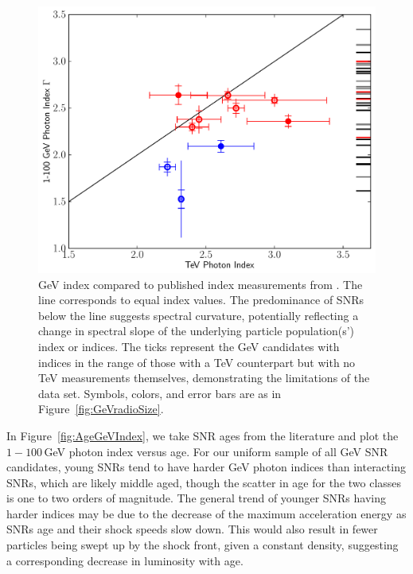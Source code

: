 \begin{figure}[h]
	\centering
	\includegraphics[width=1.0\columnwidth]{figures/gev_vs_tev_index.pdf}
	\caption[GeV index compared to published index measurements from \iacts{}.]{GeV index compared to published index measurements from \iacts{}. The line corresponds to equal index values. The predominance of SNRs below the line suggests spectral curvature, potentially reflecting a change in spectral slope of the underlying particle population(s') index or indices. The ticks represent the GeV candidates with indices in the range of those with a TeV counterpart but with no TeV measurements themselves, demonstrating the limitations of the data set. Symbols, colors, and error bars are as in Figure~\ref{fig:GeVradioSize}. 
	}
	\label{fig:GeVTeVIndex}
\end{figure}

In Figure~\ref{fig:AgeGeVIndex}, we take SNR ages from the literature and plot the $1-100$\,GeV photon index versus age. For our uniform sample of all GeV SNR candidates, young SNRs tend to have harder GeV photon indices than interacting SNRs, which are likely middle aged, though the scatter in age for the two classes is one to two orders of magnitude. The general trend of younger SNRs having harder indices may be due to the decrease of the maximum acceleration energy as SNRs age and their shock speeds slow down. This would also result in fewer particles being swept up by the shock front, given a constant density, suggesting a corresponding decrease in luminosity with age.


